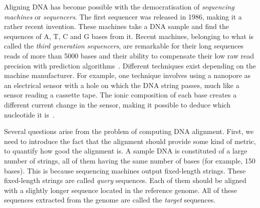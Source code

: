 Aligning DNA has become possible with the democratisation of \emph{sequencing machines} or \emph{sequencers}. The first sequencer was released in 1986, making it a rather recent invention. These machines take a DNA sample and find the sequences of A, T, C and G bases from it. Recent machines, belonging to what is called the \emph{third generation sequencers}, are remarkable for their long sequences reads of more than 5000 bases and their ability to compensate their low raw read precision with prediction algorithms~\cite{Lee048603}. Different techniques exist depending on the machine manufacturer. For example, one technique involves using a nanopore as an electrical sensor with a hole on which the DNA string passes, much like a sensor reading a cassette tape. The ionic composition of each base creates a different current change in the sensor, making it possible to deduce which nucleotide it is~\cite{Oxford:nanopore}.

Several questions arise from the problem of computing DNA alignment. First, we need to introduce the fact that the alignment should provide some kind of metric, to quantify how good the alignment is. A sample DNA is constituted of a large number of strings, all of them having the same number of bases (for example, 150 bases). This is because sequencing machines output fixed-length strings. These fixed-length strings are called \emph{query} sequences. Each of them should be aligned with a slightly longer sequence located in the reference genome. All of these sequences extracted from the genome are called the \emph{target} sequences.

